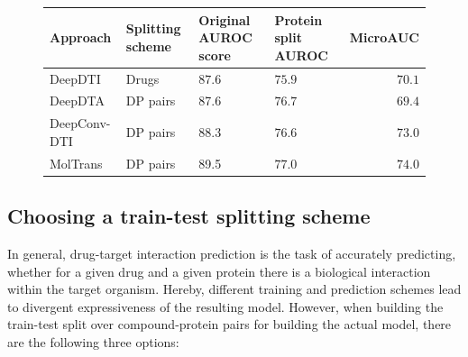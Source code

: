 \documentclass{bioinfo}
\begin{document}
\begin{figure}[!tpb]%
	\begin{tabular}{|l|p{1cm}|p{1cm}|p{1cm}|r|}
		\hline
		Approach&Splitting scheme&Original AUROC score&Protein split AUROC&MicroAUC\\
		\hline
		DeepDTI&Drugs&$87.6$&$75.9$&$70.1$\\
		DeepDTA&DP pairs&87.6&$76.7$&$69.4$\\
		DeepConv-DTI&DP pairs&88.3&$76.6$&$73.0$\\
		MolTrans&DP pairs&89.5&$77.0$&$74.0$\\
		
		\hline
	\end{tabular}
\end{figure}


\subsection{Choosing a train-test splitting scheme}


In general, drug-target interaction prediction is the task of accurately predicting, whether for a given drug and a given protein there is a biological interaction within the target organism. Hereby, different training and prediction schemes lead to divergent expressiveness of the resulting model. However, when building the train-test split over compound-protein pairs for building the actual model, there are the following three options:
\end{document}
